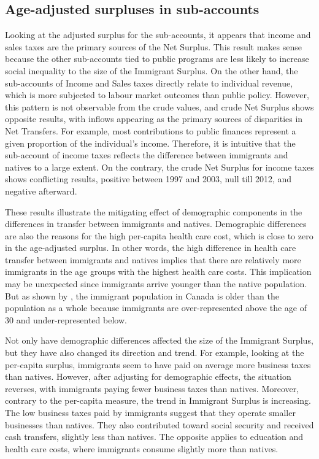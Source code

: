 \subsection{Age-adjusted surpluses in sub-accounts}

Looking at the adjusted surplus for the sub-accounts, it appears that income and sales taxes are the primary sources of the Net Surplus.
This result makes sense because the other sub-accounts tied to public programs are less likely to increase social inequality to the size of the Immigrant Surplus.
On the other hand, the sub-accounts of Income and Sales taxes directly relate to individual revenue, which is more subjected to labour market outcomes than public policy.
However, this pattern is not observable from the crude values, and crude Net Surplus shows opposite results, with inflows appearing as the primary sources of disparities in Net Transfers.
For example, most contributions to public finances represent a given proportion of the individual's income.
Therefore, it is intuitive that the sub-account of income taxes reflects the difference between immigrants and natives to a large extent.
On the contrary, the crude Net Surplus for income taxes shows conflicting results, positive between 1997 and 2003, null till 2012, and negative afterward.

\vspace{0.7em}\par
These results illustrate the mitigating effect of demographic components in the differences in transfer between immigrants and natives.
Demographic differences are also the reasons for the high per-capita health care cost, which is close to zero in the age-adjusted surplus.
In other words, the high difference in health care transfer between immigrants and natives implies that there are relatively more immigrants in the age groups with the highest health care costs.
This implication may be unexpected since immigrants arrive younger than the native population. But as shown by \citet[p~244]{Malenfant.2011}, the immigrant population in Canada is older than the population as a whole because immigrants are over-represented above the age of 30 and under-represented below.

\vspace{0.7em}\par
Not only have demographic differences affected the size of the Immigrant Surplus, but they have also changed its direction and trend.
For example, looking at the per-capita surplus, immigrants seem to have paid on average more business taxes than natives.
However, after adjusting for demographic effects, the situation reverses, with immigrants paying fewer business taxes than natives. Moreover, contrary to the per-capita measure, the trend in Immigrant Surplus is increasing.
The low business taxes paid by immigrants suggest that they operate smaller businesses than natives.
They also contributed toward social security and received cash transfers, slightly less than natives.
The opposite applies to education and health care costs, where immigrants consume slightly more than natives.

